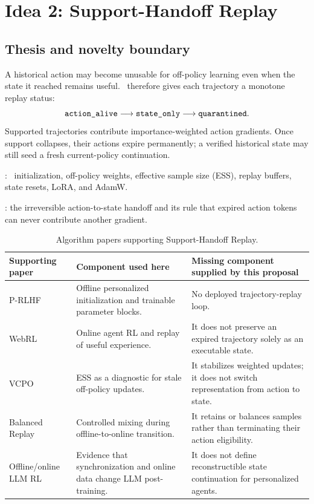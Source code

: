 \section{Idea 2: Support-Handoff Replay}
\label{sec:support-handoff}

\subsection{Thesis and novelty boundary}

A historical action may become unusable for off-policy learning even when the
state it reached remains useful.  \shorthand\ therefore gives each trajectory
a monotone replay status:
\[
  \texttt{action\_alive}\longrightarrow\texttt{state\_only}
  \longrightarrow\texttt{quarantined}.
\]
Supported trajectories contribute importance-weighted action gradients.  Once
support collapses, their actions expire permanently; a verified historical
state may still seed a fresh current-policy continuation.

\Inherited: \prlhf\ initialization, off-policy weights, effective sample size
(ESS), replay buffers, state resets, LoRA, and AdamW.

\Proposed: the irreversible action-to-state handoff and its rule that expired
action tokens can never contribute another gradient.

\begin{table}[t]
  \centering
  \caption{Algorithm papers supporting Support-Handoff Replay.}
  \label{tab:handoff-support}
  \begin{tabularx}{\textwidth}{@{}L{0.24\textwidth}Y Y@{}}
    \toprule
    Supporting paper & Component used here & Missing component supplied by this proposal \\
    \midrule
    P-RLHF \citep{li2024personalized} &
    Offline personalized initialization and trainable parameter blocks. &
    No deployed trajectory-replay loop. \\
    WebRL \citep{qi2025webrl} &
    Online agent RL and replay of useful experience. &
    It does not preserve an expired trajectory solely as an executable state. \\
    VCPO \citep{huang2026stable} &
    ESS as a diagnostic for stale off-policy updates. &
    It stabilizes weighted updates; it does not switch representation from
    action to state. \\
    Balanced Replay \citep{lee2021offlinetoonline} &
    Controlled mixing during offline-to-online transition. &
    It retains or balances samples rather than terminating their action
    eligibility. \\
    Offline/online LLM RL \citep{lanchantin2025bridging} &
    Evidence that synchronization and online data change LLM post-training. &
    It does not define reconstructible state continuation for personalized
    agents. \\
    \bottomrule
  \end{tabularx}
\end{table}

